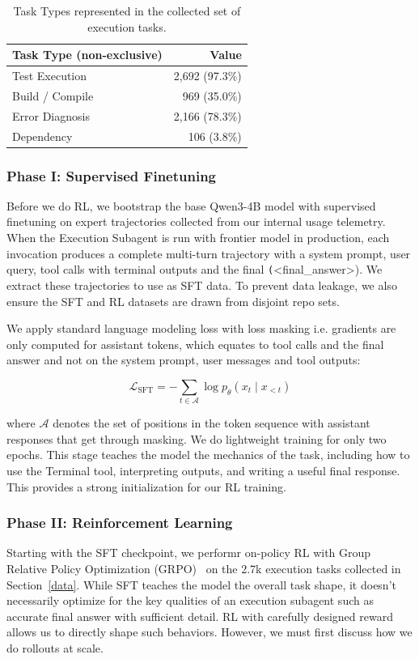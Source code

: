 \documentclass[sigconf,review]{acmart}
\begin{document}
\begin{table}[t]
\centering
\caption{Task Types represented in the collected set of execution tasks.}
\label{dataset_task_types}
\small
\begin{tabular}{lr}
\toprule
\textbf{Task Type (non-exclusive)} & \textbf{Value} \\
\midrule
Test Execution & 2{,}692 (97.3\%) \\
Build / Compile & 969 (35.0\%) \\
Error Diagnosis & 2{,}166 (78.3\%) \\
Dependency & 106 (3.8\%) \\
\bottomrule
\end{tabular}
\end{table}

\subsubsection{Phase I: Supervised Finetuning}
Before we do RL, we bootstrap the base Qwen3-4B model with supervised finetuning on expert trajectories collected from our internal usage telemetry. When the Execution Subagent is run with frontier model in production, each invocation produces a complete multi-turn trajectory with a system prompt, user query, tool calls with terminal outputs and the final \texttt(<final\_answer>). We extract these trajectories to use as SFT data. To prevent data leakage, we also ensure the SFT and RL datasets are drawn from disjoint repo sets.

We apply standard language modeling loss with loss masking i.e. gradients are only computed for assistant tokens, which equates to tool calls and the final answer and not on the system prompt, user messages and tool outputs:

\begin{equation}
\mathcal{L}_{\text{SFT}} = -\sum_{t \in \mathcal{A}} \log p_\theta(x_t \mid x_{<t})
\label{eq:sft}
\end{equation}

\noindent where $\mathcal{A}$ denotes the set of positions in the token sequence with assistant responses that get through masking. We do lightweight training for only two epochs. This stage teaches the model the mechanics of the task, including how to use the Terminal tool, interpreting outputs, and writing a useful final response. This provides a strong initialization for our RL training. %

\subsubsection{Phase II: Reinforcement Learning}
Starting with the SFT checkpoint, we performr on-policy RL with Group Relative Policy Optimization (GRPO)~\cite{grpo} on the 2.7k execution tasks collected in Section~\ref{data}. While SFT teaches the model the overall task shape, it doesn't necessarily optimize for the key qualities of an execution subagent such as accurate final answer with sufficient detail. RL with carefully designed reward allows us to directly shape such behaviors. However, we must first discuss how we do rollouts at scale.
\end{document}
